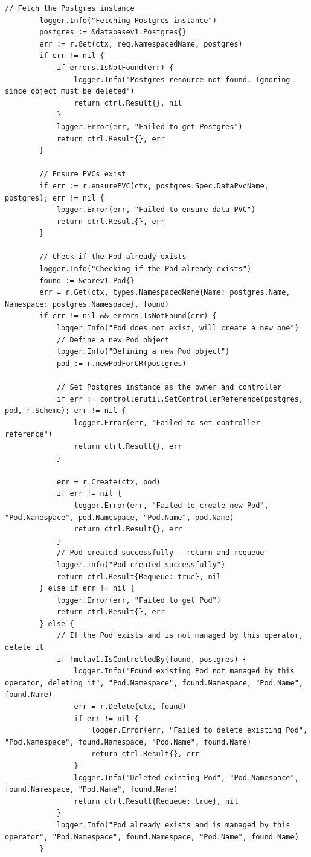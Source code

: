 \documentclass[polish]{aghengthesis}
\begin{document}
\begin{enumerate}
\begin{lstlisting}[caption=fragment kontrolera dla PostgreSQL]
    	// Fetch the Postgres instance
    	logger.Info("Fetching Postgres instance")
    	postgres := &databasev1.Postgres{}
    	err := r.Get(ctx, req.NamespacedName, postgres)
    	if err != nil {
    		if errors.IsNotFound(err) {
    			logger.Info("Postgres resource not found. Ignoring since object must be deleted")
    			return ctrl.Result{}, nil
    		}
    		logger.Error(err, "Failed to get Postgres")
    		return ctrl.Result{}, err
    	}
    
    	// Ensure PVCs exist
    	if err := r.ensurePVC(ctx, postgres.Spec.DataPvcName, postgres); err != nil {
    		logger.Error(err, "Failed to ensure data PVC")
    		return ctrl.Result{}, err
    	}
    
    	// Check if the Pod already exists
    	logger.Info("Checking if the Pod already exists")
    	found := &corev1.Pod{}
    	err = r.Get(ctx, types.NamespacedName{Name: postgres.Name, Namespace: postgres.Namespace}, found)
    	if err != nil && errors.IsNotFound(err) {
    		logger.Info("Pod does not exist, will create a new one")
    		// Define a new Pod object
    		logger.Info("Defining a new Pod object")
    		pod := r.newPodForCR(postgres)
    
    		// Set Postgres instance as the owner and controller
    		if err := controllerutil.SetControllerReference(postgres, pod, r.Scheme); err != nil {
    			logger.Error(err, "Failed to set controller reference")
    			return ctrl.Result{}, err
    		}
    
    		err = r.Create(ctx, pod)
    		if err != nil {
    			logger.Error(err, "Failed to create new Pod", "Pod.Namespace", pod.Namespace, "Pod.Name", pod.Name)
    			return ctrl.Result{}, err
    		}
    		// Pod created successfully - return and requeue
    		logger.Info("Pod created successfully")
    		return ctrl.Result{Requeue: true}, nil
    	} else if err != nil {
    		logger.Error(err, "Failed to get Pod")
    		return ctrl.Result{}, err
    	} else {
    		// If the Pod exists and is not managed by this operator, delete it
    		if !metav1.IsControlledBy(found, postgres) {
    			logger.Info("Found existing Pod not managed by this operator, deleting it", "Pod.Namespace", found.Namespace, "Pod.Name", found.Name)
    			err = r.Delete(ctx, found)
    			if err != nil {
    				logger.Error(err, "Failed to delete existing Pod", "Pod.Namespace", found.Namespace, "Pod.Name", found.Name)
    				return ctrl.Result{}, err
    			}
    			logger.Info("Deleted existing Pod", "Pod.Namespace", found.Namespace, "Pod.Name", found.Name)
    			return ctrl.Result{Requeue: true}, nil
    		}
    		logger.Info("Pod already exists and is managed by this operator", "Pod.Namespace", found.Namespace, "Pod.Name", found.Name)
    	}
    

\end{lstlisting}
\end{enumerate}
\end{document}
